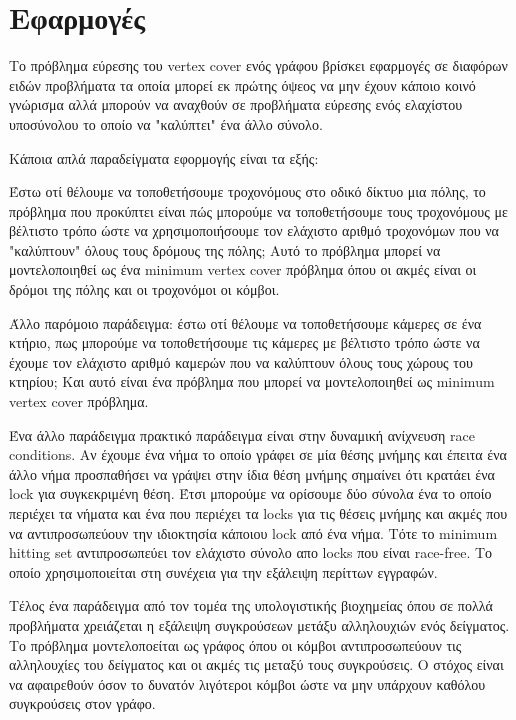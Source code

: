 \chapter{Εφαρμογές} %

\label{Chapter4} %

Το πρόβλημα εύρεσης του vertex cover ενός γράφου βρίσκει εφαρμογές σε διαφόρων ειδών προβλήματα τα οποία μπορεί εκ πρώτης όψεος να μην έχουν κάποιο κοινό γνώρισμα αλλά μπορούν να αναχθούν σε προβλήματα εύρεσης ενός ελαχίστου υποσύνολου το οποίο να "καλύπτει" ένα άλλο σύνολο.

\par{
Κάποια απλά παραδείγματα εφορμογής είναι τα εξής:

Έστω οτί θέλουμε να τοποθετήσουμε τροχονόμους στο οδικό δίκτυο μια πόλης, το πρόβλημα που προκύπτει είναι πώς μπορούμε να τοποθετήσουμε τους τροχονόμους με βέλτιστο τρόπο ώστε να χρησιμοποιήσουμε τον ελάχιστο αριθμό τροχονόμων που να "καλύπτουν" όλους τους δρόμους της πόλης; 
Αυτό το πρόβλημα μπορεί να μοντελοποιηθεί ως ένα minimum vertex cover πρόβλημα όπου οι ακμές είναι οι δρόμοι της πόλης και οι τροχονόμοι οι κόμβοι.
}
\par{
Άλλο παρόμοιο παράδειγμα: έστω οτί θέλουμε να τοποθετήσουμε κάμερες σε ένα κτήριο, πως μπορούμε να τοποθετήσουμε τις κάμερες με βέλτιστο τρόπο ώστε να έχουμε τον ελάχιστο αριθμό καμερών που να καλύπτουν όλους τους χώρους του κτηρίου; Και αυτό είναι ένα πρόβλημα που μπορεί να μοντελοποιηθεί ως minimum vertex cover πρόβλημα.
}

\par{
Ένα άλλο παράδειγμα πρακτικό παράδειγμα είναι στην δυναμική ανίχνευση race conditions. Αν έχουμε ένα νήμα το οποίο γράφει σε μία θέσης μνήμης και έπειτα ένα άλλο νήμα προσπαθήσει να γράψει στην ίδια θέση μνήμης σημαίνει ότι κρατάει ένα lock για συγκεκριμένη θέση. Έτσι μπορούμε να ορίσουμε δύο σύνολα ένα το οποίο περιέχει τα νήματα και ένα που περιέχει τα locks για τις θέσεις μνήμης και ακμές που να αντιπροσωπεύουν την ιδιοκτησία κάποιου lock από ένα νήμα. Τότε το minimum hitting set αντιπροσωπεύει τον ελάχιστο σύνολο απο locks που είναι race-free. Το οποίο χρησιμοποιείται στη συνέχεια για την εξάλειψη περίττων εγγραφών.
}

\par{
	Τέλος ένα παράδειγμα από τον τομέα της υπολογιστικής βιοχημείας όπου σε πολλά προβλήματα χρειάζεται η εξάλειψη συγκρούσεων μετάξυ αλληλουχιών ενός δείγματος. Το πρόβλημα μοντελοποείται ως γράφος όπου οι κόμβοι αντιπροσωπεύουν τις αλληλουχίες του δείγματος και οι ακμές τις μεταξύ τους συγκρούσεις. Ο στόχος είναι να αφαιρεθούν όσον το δυνατόν λιγότεροι κόμβοι ώστε να μην υπάρχουν καθόλου συγκρούσεις στον γράφο.
	}